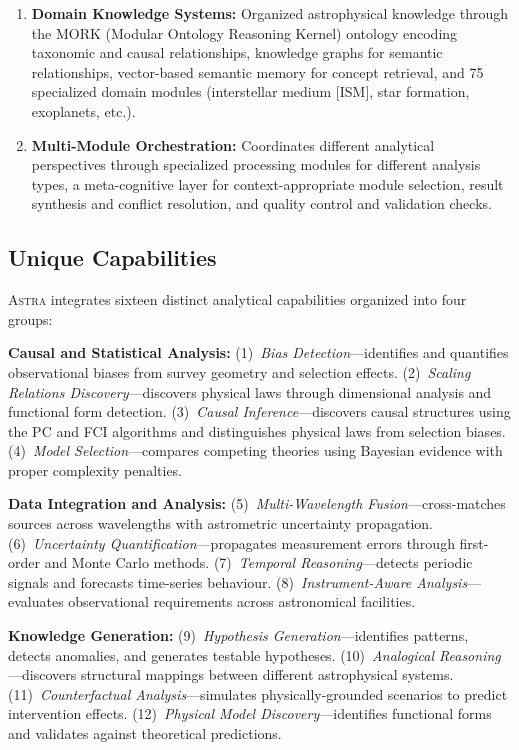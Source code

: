 \documentclass[usenatbib]{rasti}
\newcommand{\astra}{\textsc{Astra}\xspace}
\newcommand{\pc}{PC\xspace}
\newcommand{\fci}{FCI\xspace}
\begin{document}
\begin{enumerate}
  \item \textbf{Domain Knowledge Systems:}
  Organized astrophysical knowledge through the MORK (Modular Ontology Reasoning Kernel) ontology encoding taxonomic and causal relationships, knowledge graphs for semantic relationships, vector-based semantic memory for concept retrieval, and 75 specialized domain modules (interstellar medium [ISM], star formation, exoplanets, etc.).

  \item \textbf{Multi-Module Orchestration:}
  Coordinates different analytical perspectives through specialized processing modules for different analysis types, a meta-cognitive layer for context-appropriate module selection, result synthesis and conflict resolution, and quality control and validation checks.
\end{enumerate}

\subsection{Unique Capabilities}
\label{sec:methods:capabilities}

\astra integrates sixteen distinct analytical capabilities organized into four groups:

\textbf{Causal and Statistical Analysis:}
(1)~\emph{Bias Detection}---identifies and quantifies observational biases from survey geometry and selection effects.
(2)~\emph{Scaling Relations Discovery}---discovers physical laws through dimensional analysis and functional form detection.
(3)~\emph{Causal Inference}---discovers causal structures using the \pc and \fci algorithms \citep{Spirtes2000,Zhang2008} and distinguishes physical laws from selection biases.
(4)~\emph{Model Selection}---compares competing theories using Bayesian evidence with proper complexity penalties.

\textbf{Data Integration and Analysis:}
(5)~\emph{Multi-Wavelength Fusion}---cross-matches sources across wavelengths with astrometric uncertainty propagation.
(6)~\emph{Uncertainty Quantification}---propagates measurement errors through first-order and Monte Carlo methods.
(7)~\emph{Temporal Reasoning}---detects periodic signals and forecasts time-series behaviour.
(8)~\emph{Instrument-Aware Analysis}---evaluates observational requirements across astronomical facilities.

\textbf{Knowledge Generation:}
(9)~\emph{Hypothesis Generation}---identifies patterns, detects anomalies, and generates testable hypotheses.
(10)~\emph{Analogical Reasoning}---discovers structural mappings between different astrophysical systems.
(11)~\emph{Counterfactual Analysis}---simulates physically-grounded scenarios to predict intervention effects.
(12)~\emph{Physical Model Discovery}---identifies functional forms and validates against theoretical predictions.
\end{document}
